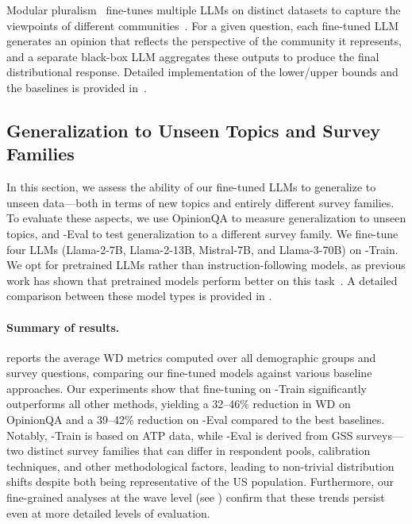 Modular pluralism~\cite{feng-etal-2024-modular} fine-tunes multiple LLMs on distinct datasets to capture the viewpoints of different communities~\cite{feng2023pretraining}. 
For a given question, each fine-tuned LLM generates an opinion that reflects the perspective of the community it represents, and a separate black-box LLM aggregates these outputs to produce the final distributional response. 
Detailed implementation of the lower/upper bounds and the baselines is provided in~.

\subsection{Generalization to Unseen Topics and Survey Families}
\label{section_experiments_prediction_of_opinion_distributions}
In this section, we assess the ability of our fine-tuned LLMs to generalize to unseen data—both in terms of new topics and entirely different survey families.
To evaluate these aspects, we use OpinionQA to measure generalization to unseen topics, and \OURDATA-Eval to test generalization to a different survey family.
We fine-tune four LLMs (Llama-2-7B, Llama-2-13B, Mistral-7B, and Llama-3-70B) on \OURDATA-Train. We opt for pretrained LLMs rather than instruction-following models, as previous work has shown that pretrained models perform better on this task~\cite{moon-etal-2024-virtual}. A detailed comparison between these model types is provided in .

\paragraph{Summary of results.} 
 reports the average WD metrics computed over all demographic groups and survey questions, comparing our fine-tuned models against various baseline approaches.
Our experiments show that fine-tuning on \OURDATA-Train significantly outperforms all other methods, yielding a 32–46\% reduction in WD on OpinionQA and a 39–42\% reduction on \OURDATA-Eval compared to the best baselines. 
Notably, \OURDATA-Train is based on ATP data, while \OURDATA-Eval is derived from GSS surveys—two distinct survey families that can differ in respondent pools, calibration techniques, and other methodological factors, leading to non-trivial distribution shifts despite both being representative of the US population. 
Furthermore, our fine-grained analyses at the wave level (see ) confirm that these trends persist even at more detailed levels of evaluation.

